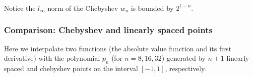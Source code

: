 \documentclass{article}
\begin{document}
    \begin{center}
    \end{center}
    { \hspace*{\fill} \\}
    
    \begin{center}
    \end{center}
    { \hspace*{\fill} \\}
    
    \begin{center}
    \end{center}
    { \hspace*{\fill} \\}
    
    Notice the \(l_\infty\) norm of the Chebyshev \(w_n\) is bounded by
\(2^{1-n}\).

\hypertarget{comparison-chebyshev-and-linearly-spaced-points}{%
\subsubsection{Comparison: Chebyshev and linearly spaced
points}\label{comparison-chebyshev-and-linearly-spaced-points}}

Here we interpolate two functions (the absolute value function and its
first derivative) with the polynomial \(p_n\) (for \(n = 8, 16, 32\))
generated by \(n+1\) linearly spaced and chebyshev points on the
interval \([-1,1]\), respectively.
\end{document}
